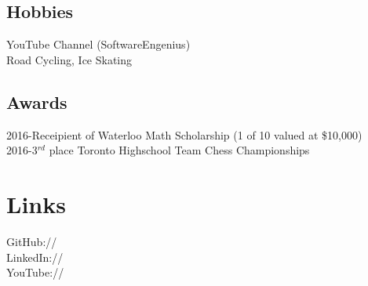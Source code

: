 \documentclass[]{deedy-resume-openfont}
\begin{document}
\begin{minipage}[t]{0.33\textwidth}
\subsection{Hobbies}
YouTube Channel (SoftwareEngenius)\\
Road Cycling, Ice Skating\\

\vspace{2mm}

\subsection{Awards}


2016-Receipient of Waterloo Math Scholarship (1 of 10 valued at \$10,000) \\
\vspace{1mm}
2016-3$^{rd}$ place Toronto Highschool Team Chess Championships \\

\vspace{1mm}


\section{Links} 
GitHub:// \href{https://github.com/MathBunny}{} \\
LinkedIn://  \href{https://www.linkedin.com/in/horatiulazu}{} \\
YouTube://  \href{https://www.youtube.com/user/SoftwareEngenius}{} \\
\sectionsep

%
%

\end{minipage} 
\end{document}
